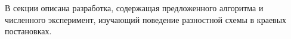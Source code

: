 В секции описана разработка, содержащая предложенного алгоритма и 
численного эксперимент, изучающий  поведение разностной схемы в краевых постановках.

